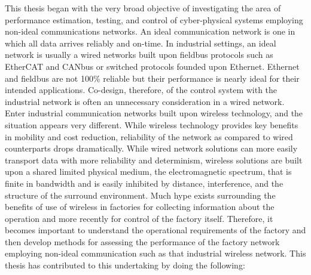 This thesis began with the very broad objective of investigating the area of performance estimation, testing, and control of cyber-physical systems employing non-ideal communications networks.  An ideal communication network is one in which all data arrives reliably and on-time.  In industrial settings, an ideal network is usually a wired networks built upon fieldbus protocols such as EtherCAT and CANbus or switched protocols founded upon Ethernet.  Ethernet and fieldbus are not 100\% reliable but their performance is nearly ideal for their intended applications.  Co-design, therefore, of the control system with the industrial network is often an unnecessary consideration in a wired network.  Enter industrial communication networks built upon wireless technology, and the situation appears very different.  While wireless technology provides key benefits in mobility and cost reduction, reliability of the network as compared to wired counterparts drops dramatically.  While wired network solutions can more easily transport data with more reliability and determinism, wireless solutions are built upon a shared limited physical medium, the electromagnetic spectrum, that is finite in bandwidth and is easily inhibited by distance, interference, and the structure of the surround environment.  Much hype exists surrounding the benefits of use of wireless in factories for collecting information about the operation and more recently for control of the factory itself.  Therefore, it becomes important to understand the operational requirements of the factory and then develop methods for assessing the performance of the factory network employing non-ideal communication such as that industrial wireless network.  This thesis has contributed to this undertaking by doing the following:

